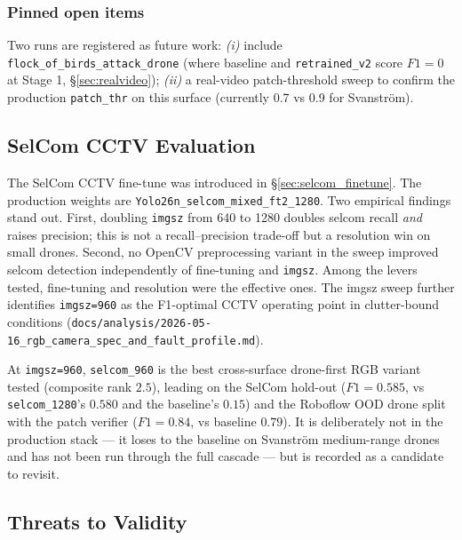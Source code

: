 \subsubsection{Pinned open items}
Two runs are registered as future work: \emph{(i)} include \texttt{flock\_of\_birds\_attack\_drone} (where baseline and \texttt{retrained\_v2} score $F1=0$ at Stage 1, \S\ref{sec:realvideo}); \emph{(ii)} a real-video patch-threshold sweep to confirm the production \texttt{patch\_thr} on this surface (currently 0.7 vs 0.9 for Svanstr\"om).

\subsection{SelCom CCTV Evaluation}
\label{sec:selcom}

The SelCom CCTV fine-tune was introduced in \S\ref{sec:selcom_finetune}. The production weights are \texttt{Yolo26n\_selcom\_mixed\_ft2\_1280}. Two empirical findings stand out. First, doubling \texttt{imgsz} from 640 to 1280 doubles selcom recall \emph{and} raises precision; this is not a recall--precision trade-off but a resolution win on small drones. Second, no OpenCV preprocessing variant in the sweep improved selcom detection independently of fine-tuning and \texttt{imgsz}. Among the levers tested, fine-tuning and resolution were the effective ones. The imgsz sweep further identifies \texttt{imgsz=960} as the F1-optimal CCTV operating point in clutter-bound conditions (\texttt{docs/analysis/2026-05-16\_rgb\_camera\_spec\_and\_fault\_profile.md}).

At \texttt{imgsz=960}, \texttt{selcom\_960} is the best cross-surface drone-first RGB variant tested (composite rank $2.5$), leading on the SelCom hold-out ($F1=0.585$, vs \texttt{selcom\_1280}'s $0.580$ and the baseline's $0.15$) and the Roboflow OOD drone split with the patch verifier ($F1=0.84$, vs baseline $0.79$). It is deliberately not in the production stack --- it loses to the baseline on Svanstr\"om medium-range drones and has not been run through the full cascade --- but is recorded as a candidate to revisit.

\subsection{Threats to Validity}
\label{sec:threats}

